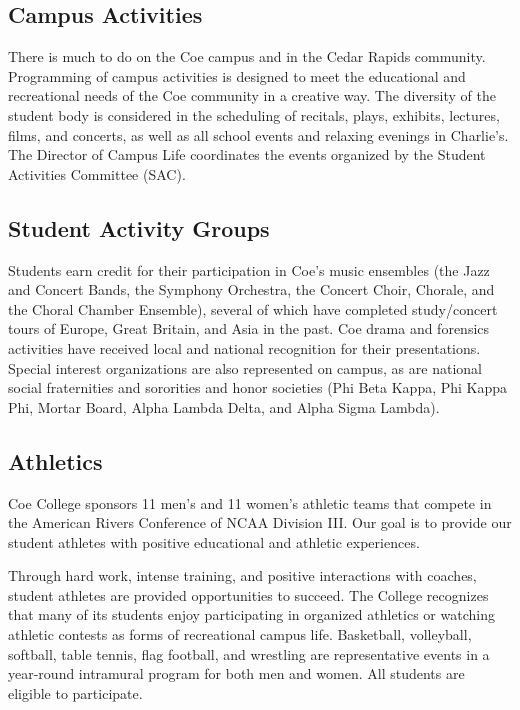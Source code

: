 \documentclass[
  letterpaper,
]{scrbook}
\begin{document}
\subsection{Campus Activities}\label{campus-activities}

There is much to do on the Coe campus and in the Cedar Rapids community.
Programming of campus activities is designed to meet the educational and
recreational needs of the Coe community in a creative way. The diversity
of the student body is considered in the scheduling of recitals, plays,
exhibits, lectures, films, and concerts, as well as all school events
and relaxing evenings in Charlie's. The Director of Campus Life
coordinates the events organized by the Student Activities Committee
(SAC).

\subsection{Student Activity Groups}\label{student-activity-groups}

Students earn credit for their participation in Coe's music ensembles
(the Jazz and Concert Bands, the Symphony Orchestra, the Concert Choir,
Chorale, and the Choral Chamber Ensemble), several of which have
completed study/concert tours of Europe, Great Britain, and Asia in the
past. Coe drama and forensics activities have received local and
national recognition for their presentations. Special interest
organizations are also represented on campus, as are national social
fraternities and sororities and honor societies (Phi Beta Kappa, Phi
Kappa Phi, Mortar Board, Alpha Lambda Delta, and Alpha Sigma Lambda).

\subsection{Athletics}\label{athletics}

Coe College sponsors 11 men's and 11 women's athletic teams that compete
in the American Rivers Conference of NCAA Division III. Our goal is to
provide our student athletes with positive educational and athletic
experiences.

Through hard work, intense training, and positive interactions with
coaches, student athletes are provided opportunities to succeed. The
College recognizes that many of its students enjoy participating in
organized athletics or watching athletic contests as forms of
recreational campus life. Basketball, volleyball, softball, table
tennis, flag football, and wrestling are representative events in a
year-round intramural program for both men and women. All students are
eligible to participate.
\end{document}
